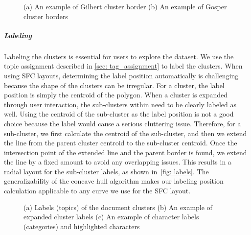 \begin{figure}%
    \centering
    \qquad
    \caption{(a) An example of Gilbert cluster border (b) An example of Gosper cluster borders}%
    \label{fig: borders}%
\end{figure}
\subparagraph{Labeling}
Labeling the clusters is essential for users to explore the dataset.
We use the topic assignment described in \autoref{sec: tag_assignment} to label the clusters.
When using SFC layouts, determining the label position automatically is challenging because the shape of the clusters can be irregular.
For a cluster, the label position is simply the centroid of the polygon.
When a cluster is expanded through user interaction, the sub-clusters within need to be clearly labeled as well.
Using the centroid of the sub-cluster as the label position is not a good choice because the label would cause a serious cluttering issue.
Therefore, for a sub-cluster, we first calculate the centroid of the sub-cluster, and then we extend the line from the parent cluster centroid to the sub-cluster centroid. 
Once the intersection point of the extended line and the parent border is found, we extend the line by a fixed amount to avoid any overlapping issues.
This results in a radial layout for the sub-cluster labels, as shown in~\autoref{fig: labels}.
The generalizability of the concave hull algorithm makes our labeling position calculation applicable to any curve we use for the SFC layout.
\begin{figure}%
    \centering
    \qquad
    \caption{(a) Labels (topics) of the document clusters (b) An example of expanded cluster labels (c) An example of character labels (categories) and highlighted characters}%
    \label{fig: labels}%
\end{figure}

